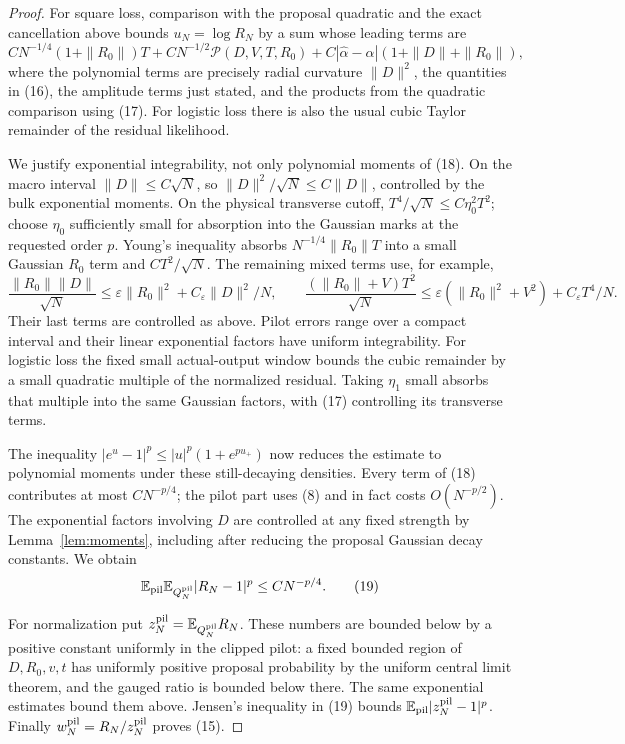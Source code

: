 \documentclass[11pt]{article}
\newcommand{\E}{\mathbb E}\newcommand{\R}{\mathbb R}
\begin{document}
\begin{proof}
For square loss, comparison with the proposal quadratic and the exact
cancellation above bounds $u_N=\log R_N$ by a sum whose leading terms are
\[
 C N^{-1/4}(1+\|R_0\|)T
 +C N^{-1/2}\mathcal P(D,V,T,R_0)
 +C|\widehat\alpha-\alpha|(1+\|D\|+\|R_0\|),          \tag{18}
\]
where the polynomial terms are precisely radial curvature $\|D\|^2$,
the quantities in (16), the amplitude terms just stated, and the products
from the quadratic comparison using (17). For logistic loss there is
also the usual cubic Taylor remainder of the residual likelihood.

We justify exponential integrability, not only polynomial moments of
(18). On the macro interval $\|D\|\le C\sqrt N$, so
$\|D\|^2/\sqrt N\le C\|D\|$, controlled by the bulk exponential
moments. On the physical transverse cutoff,
$T^4/\sqrt N\le C\eta_0^2T^2$; choose $\eta_0$ sufficiently small
for absorption into the Gaussian marks at the requested order $p$.
Young's inequality absorbs $N^{-1/4}\|R_0\|T$ into a small Gaussian
$R_0$ term and $CT^2/\sqrt N$. The remaining mixed terms use, for example,
\[
 \frac{\|R_0\|\|D\|}{\sqrt N}
       \le\varepsilon\|R_0\|^2+C_\varepsilon\|D\|^2/N,
 \qquad
 \frac{(\|R_0\|+V)T^2}{\sqrt N}
       \le\varepsilon(\|R_0\|^2+V^2)+C_\varepsilon T^4/N.
\]
Their last terms are controlled as above. Pilot errors range over a
compact interval and their linear exponential factors have uniform
integrability. For logistic loss the fixed small actual-output window
bounds the cubic remainder by a small quadratic multiple of the
normalized residual. Taking $\eta_1$ small absorbs that multiple into
the same Gaussian factors, with (17) controlling its transverse terms.

The inequality $|e^u-1|^p\le |u|^p(1+e^{pu_+})$ now reduces the
estimate to polynomial moments under these still-decaying densities.
Every term of (18) contributes at most $CN^{-p/4}$; the pilot part uses
(8) and in fact costs $O(N^{-p/2})$. The exponential factors involving
$D$ are controlled at any fixed strength by Lemma~\ref{lem:moments},
including after reducing the proposal Gaussian decay constants.
We obtain
\[
                  \E_{\rm pil}\E_{Q_N^{\rm pil}}|R_N-1|^p
                                              \le CN^{-p/4}. \tag{19}
\]

For normalization put $z_N^{\rm pil}=\E_{Q_N^{\rm pil}}R_N$.
These numbers are bounded below by a positive constant uniformly in
the clipped pilot: a fixed bounded region of $D,R_0,v,t$ has uniformly
positive proposal probability by the uniform central limit theorem,
and the gauged ratio is bounded below there. The same exponential
estimates bound them above. Jensen's inequality in (19) bounds
$\E_{\rm pil}|z_N^{\rm pil}-1|^p$. Finally
$w_N^{\rm pil}=R_N/z_N^{\rm pil}$ proves (15).
\end{proof}
\end{document}
